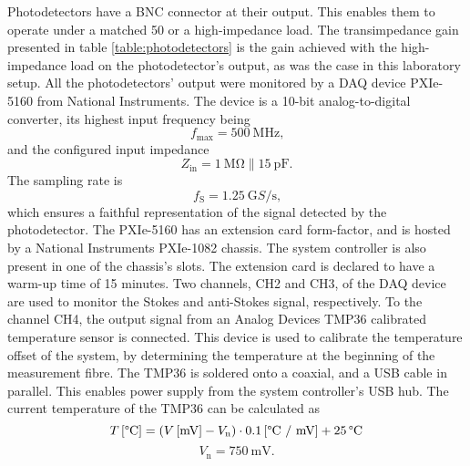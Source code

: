 \documentclass{standalone}
\begin{document}
Photodetectors have a BNC connector at their output. This enables them to operate under a matched 50 \textOmega or a high-impedance load. The transimpedance gain presented in table \ref{table:photodetectors} is the gain achieved with the high-impedance load on the photodetector's output, as was the case in this laboratory setup. All the photodetectors' output were monitored by a DAQ device PXIe-5160 from National Instruments. The device is a 10-bit analog-to-digital converter, its highest input frequency being
\begin{equation}
f_\textrm{max} = \SI{500}{\mega \hertz} \textrm{,}
\end{equation}
and the configured input impedance
\begin{equation}
Z_\textrm{in} = \SI{1}{\mega \ohm} \| \SI{15}{\pico \farad} \textrm{.}
\end{equation}
The sampling rate is
\begin{equation}
f_\textrm{S} = \SI{1.25}{\giga S / \second} \textrm{,}
\end{equation}
which ensures a faithful representation of the signal detected by the photodetector. The PXIe-5160 has an extension card form-factor, and is hosted by a National Instruments PXIe-1082 chassis. The system controller is also present in one of the chassis's slots. The extension card is declared to have a warm-up time of 15 minutes. Two channels, CH2 and CH3, of the DAQ device are used to monitor the Stokes and anti-Stokes signal, respectively. To the channel CH4, the output signal from an Analog Devices TMP36 calibrated temperature sensor is connected. This device is used to calibrate the temperature offset of the system, by determining the temperature at the beginning of the measurement fibre. The TMP36 is soldered onto a coaxial, and a USB cable in parallel. This enables power supply from the system controller's USB hub. The current temperature of the TMP36 can be calculated as \cite{datasheet:tmp36}
\begin{equation}
T \, \textrm{[\textdegree C]} = \left( V \, \textrm{[mV]} - V_\textrm{n} \right) \cdot 0.1 \, \textrm{[\textdegree C / mV]} + 25 \, \textrm{\textdegree C}
\end{equation}
\begin{equation}
V_\textrm{n} = \SI{750}{\milli \volt} \textrm{.}
\end{equation}
\end{document}
